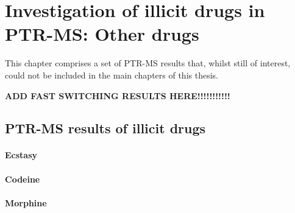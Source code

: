 \chapter{Investigation of illicit drugs in PTR-MS: Other drugs}

This chapter comprises a set of PTR-MS results that, whilst still of interest, could not be included in the main chapters of this thesis.

\textbf{ADD FAST SWITCHING RESULTS HERE!!!!!!!!!!!}

\section{PTR-MS results of illicit drugs}




\subsubsection{Ecstasy}




\subsubsection{Codeine}




\subsubsection{Morphine}



